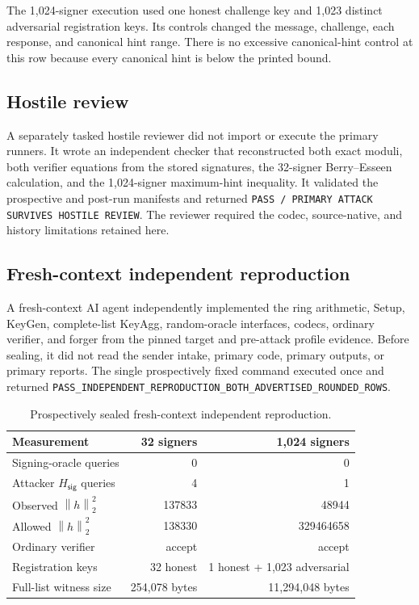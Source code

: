 \documentclass[10pt,a4paper]{article}
\newcommand{\norm}[1]{\left\lVert #1\right\rVert_2}
\newcommand{\Hsig}{H_{\mathsf{sig}}}
\begin{document}
The 1,024-signer execution used one honest challenge key and 1,023 distinct
adversarial registration keys. Its controls changed the message, challenge,
each response, and canonical hint range. There is no excessive canonical-hint
control at this row because every canonical hint is below the printed bound.

\subsection{Hostile review}

A separately tasked hostile reviewer did not import or execute the primary
runners. It wrote an independent checker that reconstructed both exact moduli,
both verifier equations from the stored signatures, the 32-signer
Berry--Esseen calculation, and the 1,024-signer maximum-hint inequality. It
validated the prospective and post-run manifests and returned
\texttt{PASS / PRIMARY ATTACK SURVIVES HOSTILE REVIEW}. The reviewer required
the codec, source-native, and history limitations retained here.

\subsection{Fresh-context independent reproduction}

A fresh-context AI agent independently implemented the ring arithmetic,
Setup, KeyGen, complete-list KeyAgg, random-oracle interfaces, codecs, ordinary
verifier, and forger from the pinned target and pre-attack profile evidence.
Before sealing, it did not read the sender intake, primary code, primary
outputs, or primary reports. The single prospectively fixed command executed
once and returned
\texttt{PASS\_INDEPENDENT\_REPRODUCTION\_BOTH\_ADVERTISED\_ROUNDED\_ROWS}.

\begin{table}[ht]
\centering
\small
\begin{tabular}{@{}lrr@{}}
\toprule
Measurement & 32 signers & 1,024 signers \\
\midrule
Signing-oracle queries & 0 & 0 \\
Attacker $\Hsig$ queries & 4 & 1 \\
Observed $\norm{h}^2$ & 137833 & 48944 \\
Allowed $\norm{h}^2$ & 138330 & 329464658 \\
Ordinary verifier & accept & accept \\
Registration keys & 32 honest & 1 honest + 1,023 adversarial \\
Full-list witness size & 254,078 bytes & 11,294,048 bytes \\
\bottomrule
\end{tabular}
\caption{Prospectively sealed fresh-context independent reproduction.}
\label{tab:independent}
\end{table}
\end{document}
